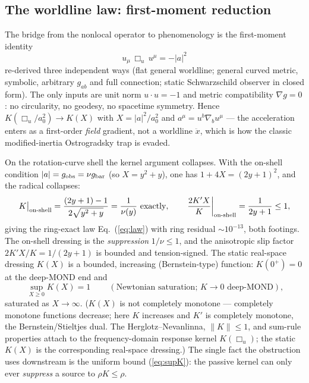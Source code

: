 \documentclass[11pt]{article}
\newcommand{\Boxu}{\Box_u}
\newcommand{\gbar}{g_{\rm bar}}
\newcommand{\gobs}{g_{\rm obs}}
\begin{document}
\subsection{The worldline law: first-moment reduction}\label{sec:firstmoment}

The bridge from the nonlocal operator to phenomenology is the first-moment identity \cite{zconcept}
\begin{equation}
\boxed{\;u_\mu\,\Boxu\,u^\mu=-|a|^2\;}
\end{equation}
re-derived three independent ways (flat general worldline; general curved metric, symbolic, arbitrary $g_{ab}$ and full connection; static Schwarzschild observer in closed form). The only inputs are unit norm $u\cdot u=-1$ and metric compatibility $\nabla g=0$: no circularity, no geodesy, no spacetime symmetry. Hence $K(\Boxu/a_0^2)\to K(X)$ with $X=|a|^2/a_0^2$ and $a^\mu=u^b\nabla_b u^\mu$ --- the acceleration enters as a first-order \emph{field} gradient, not a worldline $\ddot x$, which is how the classic modified-inertia Ostrogradsky trap is evaded.

On the rotation-curve shell the kernel argument collapses. With the on-shell condition $|a|=\gobs=\nu\gbar$ (so $X=y^2+y$), one has $1+4X=(2y+1)^2$, and the radical collapses:
\begin{equation}
K\big|_{\rm on\text{-}shell}=\frac{(2y+1)-1}{2\sqrt{y^2+y}}=\frac{1}{\nu(y)}\ \text{exactly},\qquad
\left.\frac{2K'X}{K}\right|_{\rm on\text{-}shell}=\frac{1}{2y+1}\le1,
\label{eq:onshell}
\end{equation}
giving the ring-exact law Eq.~(\ref{eq:law}) with ring residual ${\sim}10^{-13}$, both footings. The on-shell dressing is the \emph{suppression} $1/\nu\le1$, and the anisotropic slip factor $2K'X/K=1/(2y+1)$ is bounded and tension-signed. The static real-space dressing $K(X)$ is a bounded, increasing (Bernstein-type) function: $K(0^+)=0$ at the deep-MOND end and
\begin{equation}
\boxed{\ \sup_{X\ge0}K(X)=1\ }\qquad(\text{Newtonian saturation; }K\to0\text{ deep-MOND}),
\label{eq:supK}
\end{equation}
saturated as $X\to\infty$. ($K(X)$ is not completely monotone --- completely monotone functions decrease; here $K$ increases and $K'$ is completely monotone, the Bernstein/Stieltjes dual. The Herglotz--Nevanlinna, $\|K\|\le1$, and sum-rule properties attach to the frequency-domain response kernel $K(\Boxu)$; the static $K(X)$ is the corresponding real-space dressing.) The single fact the obstruction uses downstream is the uniform bound (\ref{eq:supK}): the passive kernel can only ever \emph{suppress} a source to $\rho K\le\rho$.
\end{document}
